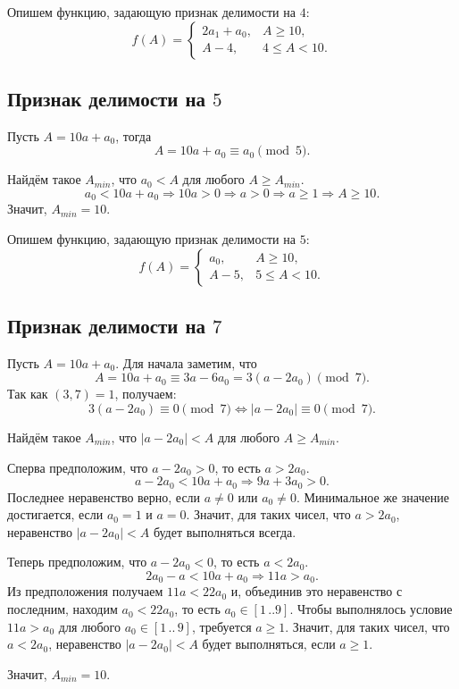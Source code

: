 \documentclass[14pt, a4paper]{extarticle}
\theoremstyle{definition}
\begin{document}
	Опишем функцию, задающую признак делимости на $4$:
	$$f(A)=\begin{cases}
		2a_1+a_0,&A\geqslant10,\\
		A-4,&4\leqslant A<10.
	\end{cases}$$

\subsection{Признак делимости на $5$}

	Пусть $A=10a+a_0$, тогда
	$$A=10a+a_0\equiv a_0\pmod5.$$

	Найдём такое $A_{min}$, что $a_0<A$ для любого $A\geqslant A_{min}$. 
	$$a_0<10a+a_0\Rightarrow10a>0\Rightarrow a>0\Rightarrow a\geqslant1\Rightarrow A\geqslant10.$$
	Значит, $A_{min}=10$.

	Опишем функцию, задающую признак делимости на $5$:
	$$f(A)=\begin{cases}
		a_0,&A\geqslant10,\\
		A-5,&5\leqslant A<10.
	\end{cases}$$

\subsection{Признак делимости на $7$}

	Пусть $A=10a+a_0$. Для начала заметим, что
	$$A=10a+a_0\equiv3a-6a_0=3(a-2a_0)\pmod7.$$
	Так как $(3,7)=1$, получаем:
	$$\boxed{3(a-2a_0)\equiv0\pmod7\Leftrightarrow|a-2a_0|\equiv0\pmod7}.$$

	Найдём такое $A_{min}$, что $|a-2a_0|<A$ для любого $A\geqslant A_{min}$.

	Сперва предположим, что $a-2a_0>0$, то есть $a>2a_0$.
	$$a-2a_0<10a+a_0\Rightarrow9a+3a_0>0.$$
	Последнее неравенство верно, если $a\neq0$ или $a_0\neq0$. Минимальное же значение достигается, если $a_0=1$ и $a=0$. Значит, для таких чисел, что $a>2a_0$, неравенство $|a-2a_0|<A$ будет выполняться всегда.

	Теперь предположим, что $a-2a_0<0$, то есть $a<2a_0$.
	$$2a_0-a<10a+a_0\Rightarrow11a>a_0.$$
	Из предположения получаем $11a<22a_0$ и, объединив это неравенство с последним, находим $a_0<22a_0$, то есть $a_0\in[1\,..9]$. Чтобы выполнялось условие $11a>a_0$ для любого $a_0\in[1\,..\,9]$, требуется $a\geqslant1$. Значит, для таких чисел, что $a<2a_0$, неравенство $|a-2a_0|<A$ будет выполняться, если $a\geqslant1$.

	Значит, $A_{min}=10$.
\end{document}
